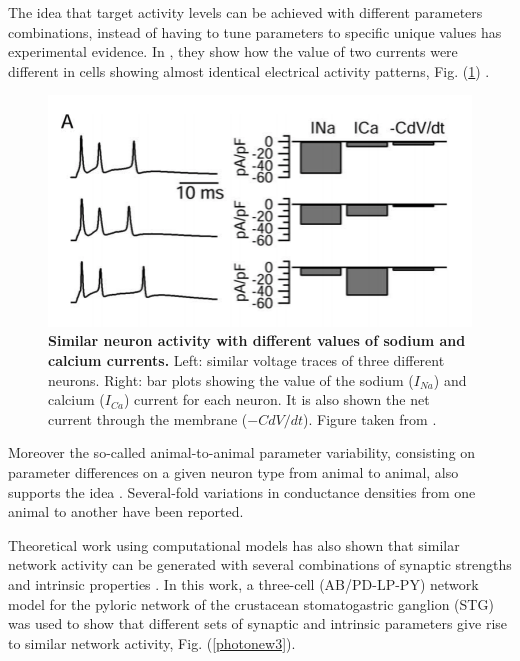 The idea that target activity levels can be achieved with different parameters combinations, instead of having to tune parameters to specific unique values has experimental evidence. In \cite{Swensen3509}, they show how the value of two currents were different in cells showing almost identical electrical activity patterns, Fig. (\ref{photonew1}) .

\begin{figure}[htb]
\centering
    \includegraphics[width=0.7\linewidth]{Images/photonew1.png} 
  \caption{\textbf{Similar neuron activity with different values of sodium and calcium currents.} Left: similar voltage traces of three different neurons. Right: bar plots showing the value of the sodium ($I_{Na}$) and calcium ($I_{Ca}$) current for each neuron. It is also shown the net current through the membrane ($-CdV/dt$). Figure taken from \cite{Swensen3509}.}
  \label{photonew1}
\end{figure}

Moreover the so-called animal-to-animal parameter variability, consisting on parameter differences on a given neuron type from animal to animal, also supports the idea \cite{Schulz2006}. Several-fold variations in conductance densities from one animal to another have been reported.

Theoretical work using computational models has also shown that similar network activity can be generated with several combinations of synaptic strengths and intrinsic properties \cite{Prinz}. In this work, a three-cell (AB/PD-LP-PY) network model for the pyloric network of the crustacean stomatogastric ganglion (STG) was used to show that different sets of synaptic and intrinsic parameters give rise to similar network activity, Fig. (\ref{photonew3}).

